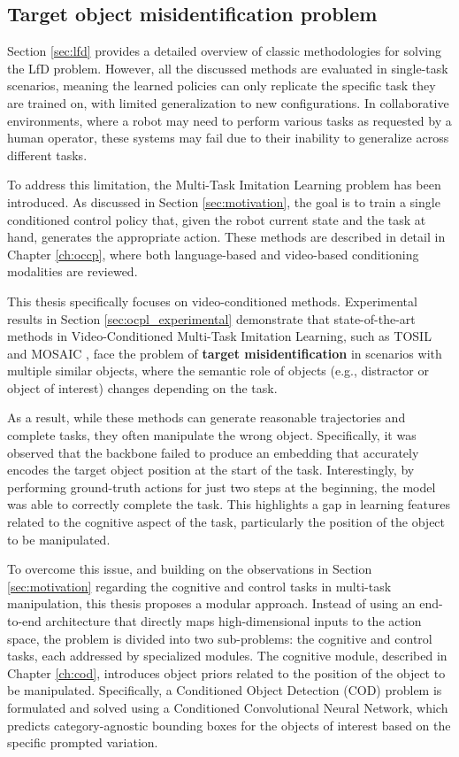 \subsection{Target object misidentification problem}
\label{sec:sota_conclusion}
Section \ref{sec:lfd} provides a detailed overview of classic methodologies for solving the LfD problem. However, all the discussed methods are evaluated in single-task scenarios, meaning the learned policies can only replicate the specific task they are trained on, with limited generalization to new configurations. In collaborative environments, where a robot may need to perform various tasks as requested by a human operator, these systems may fail due to their inability to generalize across different tasks.

To address this limitation, the Multi-Task Imitation Learning problem has been introduced. As discussed in Section \ref{sec:motivation}, the goal is to train a single conditioned control policy that, given the robot current state and the task at hand, generates the appropriate action. These methods are described in detail in Chapter \ref{ch:occp}, where both language-based and video-based conditioning modalities are reviewed.

This thesis specifically focuses on video-conditioned methods. Experimental results in Section \ref{sec:ocpl_experimental} demonstrate that state-of-the-art methods in Video-Conditioned Multi-Task Imitation Learning, such as TOSIL \cite{dasari2021transformers_one_shot} and MOSAIC \cite{mandi2022towards_more_generalizable_one_shot}, face the problem of \textbf{target misidentification} in scenarios with multiple similar objects, where the semantic role of objects (e.g., distractor or object of interest) changes depending on the task.

As a result, while these methods can generate reasonable trajectories and complete tasks, they often manipulate the wrong object. Specifically, it was observed that the backbone failed to produce an embedding that accurately encodes the target object position at the start of the task. Interestingly, by performing ground-truth actions for just two steps at the beginning, the model was able to correctly complete the task. This highlights a gap in learning features related to the cognitive aspect of the task, particularly the position of the object to be manipulated.

To overcome this issue, and building on the observations in Section \ref{sec:motivation} regarding the cognitive and control tasks in multi-task manipulation, this thesis proposes a modular approach. Instead of using an end-to-end architecture that directly maps high-dimensional inputs to the action space, the problem is divided into two sub-problems: the cognitive and control tasks, each addressed by specialized modules. The cognitive module, described in Chapter \ref{ch:cod}, introduces object priors related to the position of the object to be manipulated. Specifically, a Conditioned Object Detection (COD) problem is formulated and solved using a Conditioned Convolutional Neural Network, which predicts category-agnostic bounding boxes for the objects of interest based on the specific prompted variation.

